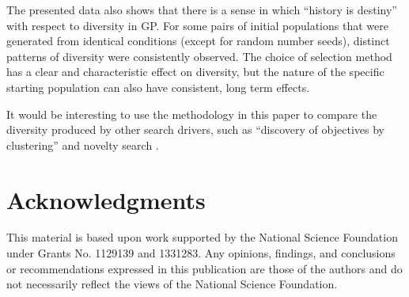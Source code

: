 \documentclass{sig-alternate-05-2015}
\begin{document}
The presented data also shows that there is a sense in which ``history is destiny'' with respect to diversity in GP. For some pairs of initial populations that were generated from identical conditions (except for random number seeds), distinct patterns of diversity were consistently observed. The choice of selection method has a clear and characteristic effect on diversity, but the nature of the specific starting population can also have consistent, long term effects.

It would be interesting to use the methodology in this paper to compare the diversity produced by other search drivers, such as ``discovery of objectives by clustering'' \cite{Krawiec:2015:EuroGP} and novelty search \cite{Lehman:2011:EDV:2001576.2001606}.


\section*{Acknowledgments}
This material is based upon work supported by the National Science Foundation under Grants No. 1129139 and 1331283. Any opinions, findings, and conclusions or recommendations expressed in this publication are those of the authors and do not necessarily reflect the views of the National Science Foundation.



%
%


\end{document}
